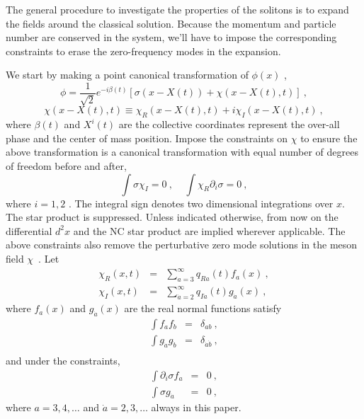 \documentclass[a4paper,a4paper]{article}
\def\da{{\dot{a}}}
\def\db{{\dot{b}}}
\begin{document}
The general procedure to investigate the properties of the solitons is
to expand the fields around the classical solution. Because the momentum
and particle number are conserved in the system, we'll 
have to impose the corresponding constraints to erase the zero-frequency 
modes in the expansion. 

We start by making a point canonical transformation of $\phi(x)$ , 
\begin{equation}
  \phi=\frac 1{\sqrt{2}}e^{-i\beta(t)}[\sigma(x-X(t))+\chi(x-X(t),t)]\
  ,                                                                                                \label{trans}
\end{equation}
\begin{equation}
  \chi(x-X(t),t)\equiv\chi_R(x-X(t),t)+i\chi_I(x-X(t),t)\ ,
\end{equation}
where $\beta(t)$ and $X^i(t)$ are the collective coordinates represent
the over-all phase and the center of mass position. Impose the constraints 
on $\chi$ to ensure
the above transformation is a canonical transformation with equal
number of degrees of freedom before and after,
\begin{equation}
  \int\sigma\chi_I=0\ ,~~~~~\int\chi_R\partial_i\sigma=0\ ,                                        \label{Const}
\end{equation}
where $i=1,2$ . The integral sign denotes two dimensional
integrations over $x$. The star product is suppressed.  Unless
indicated otherwise, from now on the differential $d^2x$ and the NC
star product are implied wherever applicable.
The above constraints also remove the perturbative zero mode
solutions in the meson field $\chi$\ .  Let
\begin{eqnarray}
  \chi_R(x,t)&=&\sum_{a=3}^{\infty}q_{Ra}(t)f_a(x)\ ,\\
  \chi_I(x,t)&=&\sum_{\da=2}^{\infty}q_{I\da}(t)g_\da(x)\ ,
\end{eqnarray}
where $f_a(x)$ and $g_\da(x)$ are the real normal functions satisfy 
\begin{eqnarray}
\int f_af_b&=&\delta_{ab}\ ,\\
\int g_{\da} g_{\db}&=&\delta_{\da\db}\ ,\\
\end{eqnarray}
and  under the constraints, 
\begin{eqnarray}
  \int \partial_i\sigma f_a&=&0\ ,\\
  \int \sigma g_\da&=&0\ ,
\end{eqnarray}
where $a=3,4,\ldots$ and $\da=2,3,\ldots$ always in this paper. 
\end{document}
